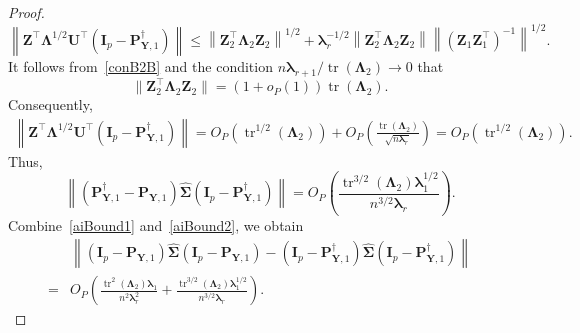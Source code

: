 \documentclass[10pt]{book}
\theoremstyle{definition}
\DeclareMathOperator{\mytr}{tr}
\newcommand{\bZ}{\mathbf{Z}}
\newcommand{\bP}{\mathbf{P}}
\newcommand{\bY}{\mathbf{Y}}
\newcommand{\bI}{\mathbf{I}}
\newcommand{\bU}{\mathbf{U}}
\newcommand{\bfsym}[1]{\ensuremath{\boldsymbol{#1}}}
\def\blambda {\bfsym {\lambda}}
\def\bLambda {\bfsym {\Lambda}}
\def\bSigma {\bfsym {\Sigma}}
\begin{document}
\begin{proof}
\begin{equation*}
        \left\|
        \bZ^\top \bLambda^{1/2}\bU^\top (\bI_p-\bP^\dagger_{\bY,1})  
        \right\|
        \leq 
         \left\|\bZ_2^\top \bLambda_2 \bZ_2\right\|^{1/2}
         +
         \blambda_r^{-1/2}  \left\|\bZ_2^\top \bLambda_2 \bZ_2\right\|  \left\|(\bZ_1\bZ_1^\top)^{-1}\right\|^{1/2}
         .
    \end{equation*}
    It follows from~\eqref{conB2B} and the condition $n\blambda_{r+1}/\mytr(\bLambda_2)\to 0$ that
    \begin{equation}\label{Z2exactL}
    \|\bZ_2^\top \bLambda_2 \bZ_2\| =\left(1+o_P(1)\right)\mytr (\bLambda_2).
    \end{equation}
        Consequently,
    \begin{equation*}
        \begin{split}
        \left\|
        \bZ^\top \bLambda^{1/2}\bU^\top (\bI_p-\bP^\dagger_{\bY,1})  
        \right\|
         = 
         O_P\left(
             \mytr^{1/2}(\bLambda_2)
         \right)
         +O_P\left(
             \frac{\mytr(\bLambda_2)}{\sqrt{n\blambda_r}}
         \right)
         = 
         O_P\left(
             \mytr^{1/2}(\bLambda_2)
         \right).
        \end{split}
    \end{equation*}
    Thus,
    \begin{equation}\label{aiBound2}
    \left\|(\bP^\dagger_{\bY,1}-\bP_{\bY,1})\hat{\bSigma}(\bI_p-\bP^\dagger_{\bY,1})\right\|
             =O_P\left(
                 \frac{\mytr^{3/2}(\bLambda_2)\blambda_1^{1/2}}{n^{3/2}\blambda_r}
                \right).
    \end{equation}
    Combine~\eqref{aiBound1} and~\eqref{aiBound2}, we obtain
    \begin{equation*}
        \begin{split}
             &\left\|(\bI_p -\bP_{\bY,1})\hat{\bSigma}(\bI_p -\bP_{\bY,1})
             -
             (\bI_p-\bP^\dagger_{\bY,1})\hat{\bSigma}(\bI_p-\bP^\dagger_{\bY,1})\right\|
             \\
             =&
             O_P\left(
                    \frac{\mytr^2(\bLambda_2)\blambda_1}{n^2 \blambda_r^2}
                 +
                 \frac{\mytr^{3/2}(\bLambda_2)\blambda_1^{1/2}}{n^{3/2}\blambda_r}
                \right).
        \end{split}
    \end{equation*}


\end{proof}
\end{document}
